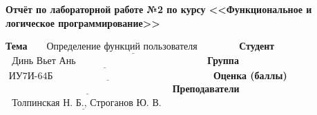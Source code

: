 \begin{titlepage}
	
	\begin{center}
		\Large\textbf{Отчёт по лабораторной работе №2 по курсу <<Функциональное и логическое программирование>>}
	\end{center}
	
	\bigskip\bigskip
	
	\noindent\textbf{Тема} $\underline{\text{~~~~~Определение функций пользователя~~~~~~~~~~~~}}$\newline\newline\newline
	\noindent\textbf{Студент} $\underline{\text{~~Динь Вьет Ань~~~~~~~~~~~~~~~~~~~~~~~~~~~~~~~~~~~~~~~~}}$\newline\newline
	\noindent\textbf{Группа} $\underline{\text{~ИУ7И-64Б~~~~~~~~~~~~~~~~~~~~~~~~~~~~~~~~~~~~~~~~~~~~~~~~~}}$\newline\newline
	\noindent\textbf{Оценка (баллы)} $\underline{\text{~~~~~~~~~~~~~~~~~~~~~~~~~~~~~~~~~~~~~~~~~~~~~~~~~~~}}$\newline\newline
	\noindent\textbf{Преподаватели} $\underline{\text{~~Толпинская~Н.~Б., Строганов~Ю.~В.}}$\newline

 \restoregeometry
\end{titlepage}
